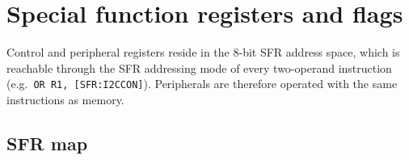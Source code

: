 \section{Special function registers and flags}
\label{sec:sfr}

Control and peripheral registers reside in the 8-bit SFR address space, which
is reachable through the SFR addressing mode of every two-operand instruction
(e.g.\ \texttt{OR R1, [SFR:I2CCON]}). Peripherals are therefore operated with
the same instructions as memory.

\subsection{SFR map}

